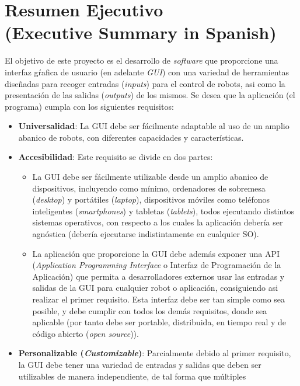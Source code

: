 \chapter{Resumen Ejecutivo\\(Executive Summary in Spanish)}

El objetivo de este proyecto es el desarrollo de \textit{software} que proporcione una interfaz gŕafica de usuario (en adelante 
\textit{GUI}) con una variedad de herramientas diseñadas para recoger entradas (\textit{inputs}) para el control de robots, asi 
como la presentación de las salidas (\textit{outputs}) de los mismos. Se desea que la aplicación (el programa) cumpla con los 
siguientes requisitos:
\begin{itemize}
	\item \textbf{Universalidad}: La GUI debe ser fácilmente adaptable al uso de un amplio abanico de robots, con diferentes 
	capacidades y características.
	\item \textbf{Accesibilidad}: Este requisito se divide en dos partes:
	\begin{itemize}
		\item La GUI debe ser fácilmente utilizable desde un amplio abanico de dispositivos, incluyendo como mínimo, 
		ordenadores de sobremesa (\textit{desktop}) y portátiles (\textit{laptop}), dispositivos móviles como teléfonos 
		inteligentes (\textit{smartphones}) y tabletas (\textit{tablets}), todos ejecutando distintos sistemas operativos, con 
		respecto a los cuales la aplicación debería ser agnóstica (debería ejecutarse indistintamente en cualquier SO).		
		\item La aplicación que proporcione la GUI debe además exponer una API (\textit{Application Programming Interface} o 
		Interfaz de Programación de la Aplicación) que permita a desarrolladores externos usar las entradas y salidas de la GUI 
		para cualquier robot o aplicación, consiguiendo asi realizar el primer requisito. Esta interfaz debe ser tan simple 
		como sea posible, y debe cumplir con todos los demás requisitos, donde sea aplicable (por tanto debe ser portable, 
		distribuida, en tiempo real y de código abierto (\textit{open source})).
	\end{itemize}
	\item \textbf{Personalizable (\textit{Customizable})}: Parcialmente debido al primer requisito, la GUI debe tener una 
	variedad de entradas y salidas que deben ser utilizables de manera independiente, de tal forma que múltiples 

\end{itemize}
